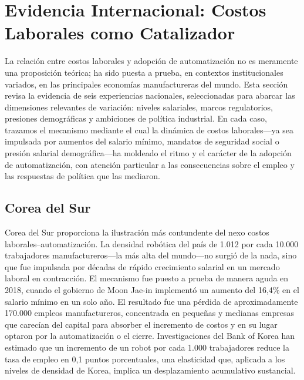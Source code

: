 \documentclass{article}
\begin{document}
\FloatBarrier

\section{Evidencia Internacional: Costos Laborales como Catalizador}
\label{sec:international}

La relaci\'on entre costos laborales y adopci\'on de automatizaci\'on no es meramente una proposici\'on te\'orica; ha sido puesta a prueba, en contextos institucionales variados, en las principales econom\'ias manufactureras del mundo. Esta secci\'on revisa la evidencia de seis experiencias nacionales, seleccionadas para abarcar las dimensiones relevantes de variaci\'on: niveles salariales, marcos regulatorios, presiones demogr\'aficas y ambiciones de pol\'itica industrial. En cada caso, trazamos el mecanismo mediante el cual la din\'amica de costos laborales---ya sea impulsada por aumentos del salario m\'inimo, mandatos de seguridad social o presi\'on salarial demogr\'afica---ha moldeado el ritmo y el car\'acter de la adopci\'on de automatizaci\'on, con atenci\'on particular a las consecuencias sobre el empleo y las respuestas de pol\'itica que las mediaron.

\subsection{Corea del Sur}
\label{subsec:korea}

Corea del Sur proporciona la ilustraci\'on m\'as contundente del nexo costos laborales--automatizaci\'on. La densidad rob\'otica del pa\'is de 1.012 por cada 10.000 trabajadores manufactureros---la m\'as alta del mundo---no surgi\'o de la nada, sino que fue impulsada por d\'ecadas de r\'apido crecimiento salarial en un mercado laboral en contracci\'on. El mecanismo fue puesto a prueba de manera aguda en 2018, cuando el gobierno de Moon Jae-in implement\'o un aumento del 16,4\% en el salario m\'inimo en un solo a\~no. El resultado fue una p\'erdida de aproximadamente 170.000 empleos manufactureros, concentrada en peque\~nas y medianas empresas que carec\'ian del capital para absorber el incremento de costos y en su lugar optaron por la automatizaci\'on o el cierre. Investigaciones del Bank of Korea han estimado que un incremento de un robot por cada 1.000 trabajadores reduce la tasa de empleo en 0,1 puntos porcentuales, una elasticidad que, aplicada a los niveles de densidad de Korea, implica un desplazamiento acumulativo sustancial.
\end{document}
